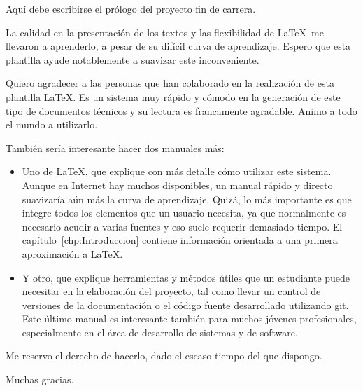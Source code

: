 



Aquí debe escribirse el prólogo del proyecto fin de carrera.

\medskip

La calidad en la presentación de los textos y las flexibilidad de \LaTeX\ me llevaron a aprenderlo, a pesar de su difícil curva de aprendizaje.
Espero que esta plantilla ayude notablemente a suavizar este inconveniente.

Quiero agradecer a las personas que han colaborado en la realización de esta plantilla \LaTeX. Es un sistema muy rápido y cómodo en la generación de este tipo de documentos técnicos y su lectura es francamente agradable. Animo a todo el mundo a utilizarlo.

También sería interesante hacer dos manuales más:

\begin{itemize}

	\item Uno de \LaTeX, que explique con más detalle cómo utilizar este sistema. Aunque en Internet hay muchos disponibles, un manual rápido y directo suavizaría aún más la curva de aprendizaje. Quizá, lo más importante es que integre todos los elementos que un usuario necesita, ya que normalmente es necesario acudir a varias fuentes y eso suele requerir demasiado tiempo.	El capítulo~\ref{chp:Introduccion} contiene información orientada a una primera aproximación a \LaTeX.

	\item Y otro, que explique herramientas y métodos útiles que un estudiante puede necesitar en la elaboración del proyecto, tal como llevar un control de versiones de la documentación o el código fuente desarrollado utilizando git. Este último manual es interesante también para muchos jóvenes profesionales, especialmente en el área de desarrollo de sistemas y de software.

\end{itemize}

	Me reservo el derecho de hacerlo, dado el escaso tiempo del que dispongo.
	\bigskip

	Muchas gracias.

\chapterend
